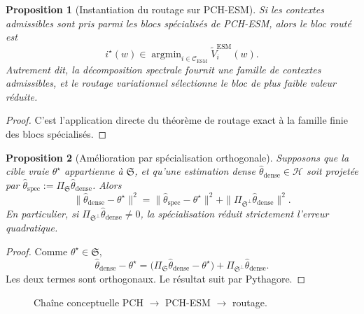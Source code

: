 \documentclass[11pt,a4paper]{article}
\newtheorem{proposition}{Proposition}[section]
\DeclareMathOperator{\argmin}{argmin}
\newcommand{\Hh}{\mathcal H}
\newcommand{\Ccal}{\mathcal C}
\begin{document}
\begin{proposition}[Instantiation du routage sur PCH-ESM]
Si les contextes admissibles sont pris parmi les blocs spécialisés de PCH-ESM, alors le bloc routé est
\[
i^\star(w)\in\argmin_{i\in\Ccal_{\mathrm{ESM}}}\widetilde V_i^{\mathrm{ESM}}(w).
\]
Autrement dit, la décomposition spectrale fournit une famille de contextes admissibles, et le routage variationnel sélectionne le bloc de plus faible valeur réduite.
\end{proposition}

\begin{proof}
C'est l'application directe du théorème de routage exact à la famille finie des blocs spécialisés.
\end{proof}

\begin{proposition}[Amélioration par spécialisation orthogonale]
Supposons que la cible vraie \(\theta^\star\) appartienne à \(\mathfrak S\), et qu'une estimation dense \(\hat\theta_{\mathrm{dense}}\in\Hh\) soit projetée par \(\hat\theta_{\mathrm{spec}}:=\Pi_{\mathfrak S}\hat\theta_{\mathrm{dense}}\). Alors
\[
\|\hat\theta_{\mathrm{dense}}-\theta^\star\|^2
=
\|\hat\theta_{\mathrm{spec}}-\theta^\star\|^2
+
\|\Pi_{\mathfrak S^\perp}\hat\theta_{\mathrm{dense}}\|^2.
\]
En particulier, si \(\Pi_{\mathfrak S^\perp}\hat\theta_{\mathrm{dense}}\neq 0\), la spécialisation réduit strictement l'erreur quadratique.
\end{proposition}

\begin{proof}
Comme \(\theta^\star\in\mathfrak S\),
\[
\hat\theta_{\mathrm{dense}}-\theta^\star
=
\bigl(\Pi_{\mathfrak S}\hat\theta_{\mathrm{dense}}-\theta^\star\bigr)+\Pi_{\mathfrak S^\perp}\hat\theta_{\mathrm{dense}}.
\]
Les deux termes sont orthogonaux. Le résultat suit par Pythagore.
\end{proof}

\begin{figure}[ht]
\centering
{}
\caption{Chaîne conceptuelle PCH \(\rightarrow\) PCH-ESM \(\rightarrow\) routage.}
\end{figure}
\end{document}
